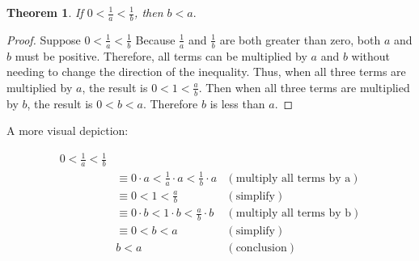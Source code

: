 
\newtheorem{theorem}{Theorem}

\begin{theorem}
  If $0 < \frac{1}{a} < \frac{1}{b}$, then $b < a.$
\end{theorem}

\begin{proof}
  Suppose $0 < \frac{1}{a} < \frac{1}{b}$ Because $\frac{1}{a}$ and
  $\frac{1}{b}$ are both greater than zero, both $a$ and $b$ must be positive.
  Therefore, all terms can be multiplied by $a$ and $b$ without needing to
  change the direction of the inequality. Thus, when all three terms are
  multiplied by $a$, the result is $0 < 1 < \frac{a}{b}$. Then when all three
  terms are multiplied by $b$, the result is $0 < b < a$. Therefore $b$ is
  less than $a$.
\end{proof}

A more visual depiction:


\begin{align*}
  0 < \frac{1}{a} < \frac{1}{b}\\  
  &\equiv 0 \cdot a < \frac{1}{a} \cdot a < \frac{1}{b} \cdot a
    &(\textrm{multiply all terms by a})\\
  &\equiv 0 < 1 < \frac{a}{b} &(\textrm{simplify})\\
  &\equiv 0 \cdot b < 1 \cdot b < \frac{a}{b} \cdot b &(\textrm{multiply all
    terms by b})\\
  & \equiv 0 < b < a &(\textrm{simplify})\\
  & b < a &(\textrm{conclusion})
\end{align*}
